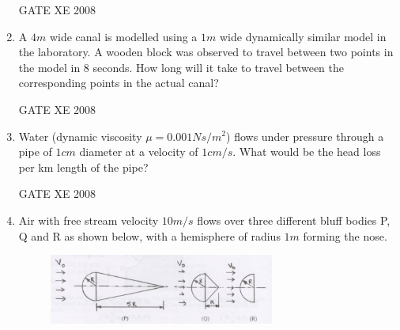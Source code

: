 \documentclass[12pt]{article}
\begin{document}
\begin{enumerate}[label=Q\arabic*.]
\begin{enumerate}[label=(\Alph*)]
\end{enumerate}

GATE XE 2008
\item A $4 m$ wide canal is modelled using a $1 m$ wide dynamically similar model in the laboratory. A wooden block was observed to travel between two points in the model in $8$ seconds. How long will it take to travel between the corresponding points in the actual canal?

\begin{enumerate}[label=(\Alph*)]
\end{enumerate}

GATE XE 2008
\item Water (dynamic viscosity $\mu = 0.001 Ns/m^2$) flows under pressure through a pipe of $1 cm$ diameter at a velocity of $1 cm/s$. What would be the head loss per km length of the pipe?

\begin{enumerate}[label=(\Alph*)]
\end{enumerate}

GATE XE 2008
\item  Air with free stream velocity $10 m/s$ flows over three different bluff bodies P, Q and R as shown below, with a hemisphere of radius $1 m$ forming the nose.

\begin{figure}[H]
\centering
  \includegraphics[width=0.7\textwidth]{figs/ass1_d_q21.png}
  \caption{}
\end{figure} 


\end{enumerate}
\end{document}

